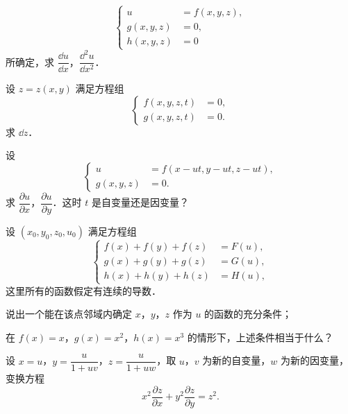\begin{xiti}
\[
\left\{\begin{aligned}
u&=f(x,y,z),\\
g(x,y,z)&=0,\\
h(x,y,z)&=0
\end{aligned}\right.
\]
所确定，求 $\dfrac{\dd u}{\dd x}$，$\dfrac{\dd^{2}u}{\dd x^{2}}$．
\item 设 $z=z(x,y)$ 满足方程组
\[
\left\{\begin{aligned}
f(x,y,z,t)&=0,\\
g(x,y,z,t)&=0.
\end{aligned}\right.
\]
求 $\dd z$．
\item 设
\[
\left\{\begin{aligned}
u&=f(x-ut,y-ut,z-ut),\\
g(x,y,z)&=0.
\end{aligned}\right.
\]
求 $\dfrac{\partial u}{\partial x}$，$\dfrac{\partial u}{\partial y}$．这时 $t$ 是自变量还是因变量？
\item 设 $(x_{0},y_{0},z_{0},u_{0})$ 满足方程组
\[
\left\{\begin{aligned}
f(x)+f(y)+f(z)&=F(u),\\
g(x)+g(y)+g(z)&=G(u),\\
h(x)+h(y)+h(z)&=H(u),
\end{aligned}\right.
\]
这里所有的函数假定有连续的导数．
\begin{ziti}
\item 说出一个能在该点邻域内确定 $x$，$y$，$z$ 作为 $u$ 的函数的充分条件；
\item 在 $f(x)=x$，$g(x)=x^{2}$，$h(x)=x^{3}$ 的情形下，上述条件相当于什么？
\end{ziti}
\item 设 $x=u$，$y=\dfrac{u}{1+uv}$，$z=\dfrac{u}{1+uw}$，取 $u$，$v$ 为新的自变量，$w$ 为新的因变量，变换方程
\[
x^{2}\frac{\partial z}{\partial x}+y^{2}\frac{\partial z}{\partial y}=z^{2}.
\]
\end{xiti}

